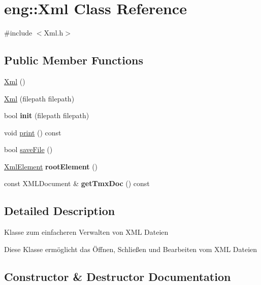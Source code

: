 \hypertarget{classeng_1_1_xml}{}\section{eng\+:\+:Xml Class Reference}
\label{classeng_1_1_xml}


{\ttfamily \#include $<$Xml.\+h$>$}

\subsection*{Public Member Functions}
\begin{DoxyCompactItemize}
\item 
\hyperlink{classeng_1_1_xml_a9573f98d9f7e92b86fcf58cea931add9}{Xml} ()
\item 
\hyperlink{classeng_1_1_xml_abc3374e37afa320f54d5ed1a02a3ba32}{Xml} (filepath filepath)
\item 
\mbox{\label{classeng_1_1_xml_ad7360970bae09b39a733b9a8dcdc2ef3}} 
bool {\bfseries init} (filepath filepath)
\item 
void \hyperlink{classeng_1_1_xml_a2906a7cf0f42524ba941570fb33aa6e4}{print} () const
\item 
bool \hyperlink{classeng_1_1_xml_a6a3612af5bf49ffb9f92e59e0a47d161}{save\+File} ()
\item 
\mbox{\label{classeng_1_1_xml_ac9105eed50dcf5580ba9466b02309604}} 
\hyperlink{classeng_1_1_xml_element}{Xml\+Element} {\bfseries root\+Element} ()
\item 
\mbox{\label{classeng_1_1_xml_a097d020188ded17929f6007678e2b6be}} 
const X\+M\+L\+Document \& {\bfseries get\+Tmx\+Doc} () const
\end{DoxyCompactItemize}


\subsection{Detailed Description}
Klasse zum einfacheren Verwalten von X\+ML Dateien

Diese Klasse ermöglicht das Öffnen, Schließen und Bearbeiten vom X\+ML Dateien 

\subsection{Constructor \& Destructor Documentation}
\mbox{\label{classeng_1_1_xml_a9573f98d9f7e92b86fcf58cea931add9}} 
